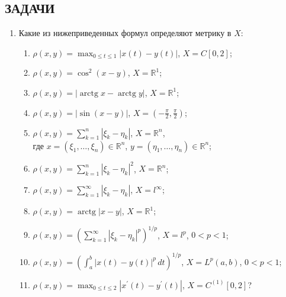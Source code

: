 \documentclass[12pt,a4paper]{article}
\begin{document}
\subsection*{ЗАДАЧИ}
\begin{enumerate}
\item Какие из нижеприведенных формул определяют метрику в $X$:
\begin{enumerate}[label=\alph*)]
\item $\rho(x, y) = \max_{0\le t\le1} |x(t) - y(t)|$, $X = C[0, 2]$;
\item $\rho(x, y) = \cos^{2}(x - y)$, $X = \mathbb{R}^{1}$;
\item $\rho(x, y) = |\operatorname{arctg} x - \operatorname{arctg} y|$, $X = \mathbb{R}^{1}$;
\item $\rho(x, y) = |\sin(x - y)|$, $X = (-\frac{\pi}{2}, \frac{\pi}{2})$;
\item $\rho(x, y) = \sum_{k=1}^{n} |\xi_{k} - \eta_{k}|$, $X = \mathbb{R}^{n}$, \\ где $x = (\xi_{1}, \dots, \xi_{n}) \in \mathbb{R}^{n}$, $y = (\eta_{1}, \dots, \eta_{n}) \in \mathbb{R}^{n}$;
\item $\rho(x, y) = \sum_{k=1}^{n} |\xi_{k} - \eta_{k}|^{2}$, $X = \mathbb{R}^{n}$;
\item $\rho(x, y) = \sum_{k=1}^{\infty} |\xi_{k} - \eta_{k}|$, $X = l^{\infty}$;
\item $\rho(x, y) = \operatorname{arctg}|x - y|$, $X = \mathbb{R}^{1}$;
\item $\rho(x, y) = \left( \sum_{k=1}^{\infty} |\xi_{k} - \eta_{k}|^{p} \right)^{1/p}$, $X = l^{p}$, $0 < p < 1$;
\item $\rho(x, y) = \left( \int_{a}^{b} |x(t) - y(t)|^{p} \, dt \right)^{1/p}$, $X = L^{p}(a, b)$, $0 < p < 1$;
\item $\rho(x, y) = \max_{0\le t\le2} |x^{\prime}(t) - y^{\prime}(t)|$, $X = C^{(1)}[0, 2]$?
\end{enumerate}


\end{enumerate}
\end{document}

